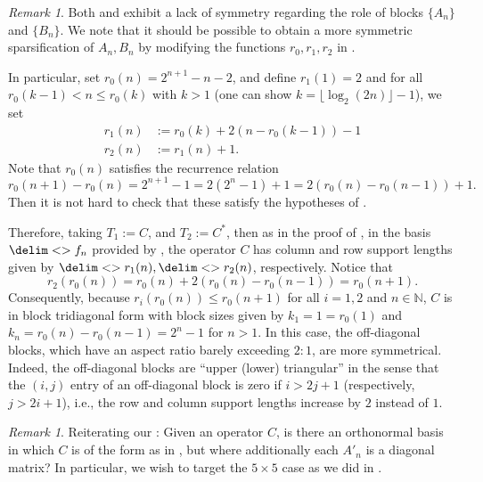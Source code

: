 \documentclass[10pt,reqno]{amsart}
\theoremstyle{remark}
\newtheorem{remark}[theorem]{Remark}
\newcommand{\seq}{\delim<>}
\numberwithin{equation}{section}
\begin{document}
\begin{remark}
  Both  and  exhibit a lack of symmetry regarding the role of blocks $\{A_n\}$ and $\{B_n\}$.
  We note that it should be possible to obtain a more symmetric sparsification of $A_n,B_n$ by modifying the functions $r_0,r_1,r_2$ in .

  In particular, set $r_0(n) = 2^{n+1} - n - 2$, and define $r_1(1) = 2$ and for all $r_0(k-1) < n \le r_0(k)$ with $k > 1$ (one can show $k = \lfloor \log_2 (2n) \rfloor - 1$), we set
  \begin{align*}
    r_1(n) &:= r_0(k) + 2 (n - r_0(k-1)) - 1 \\
    r_2(n) &:= r_1(n) + 1.
  \end{align*}
  Note that $r_0(n)$ satisfies the recurrence relation
  \begin{equation*}
    r_0(n+1) - r_0(n) = 2^{n+1} - 1 = 2(2^n - 1) + 1 = 2(r_0(n) - r_0(n-1)) + 1.
  \end{equation*}
  Then it is not hard to check that these satisfy the hypotheses of .

  Therefore, taking $T_1 := C$, and $T_2 := C^{*}$, then as in the proof of , in the basis $\seq{f_n}$ provided by , the operator $C$ has column and row support lengths given by $\seq{r_1(n)}, \seq{r_2(n)}$, respectively.
  Notice that
  \begin{equation*}
    r_2(r_0(n)) = r_0(n) + 2 (r_0(n) - r_0(n-1)) = r_0(n+1).
  \end{equation*}
  Consequently, because $r_i(r_0(n)) \le r_0(n+1)$ for all $i = 1,2$ and $n \in \mathbb{N}$, $C$ is in block tridiagonal form with block sizes given by $k_1 = 1 = r_0(1)$ and $k_n = r_0(n) - r_0(n-1) = 2^n - 1$ for $n > 1$.
  In this case, the off-diagonal blocks, which have an aspect ratio barely exceeding $2 : 1$, are more symmetrical.
  Indeed, the off-diagonal blocks are ``upper (lower) triangular'' in the sense that the $(i,j)$ entry of an off-diagonal block is zero if $i > 2j+1$ (respectively, $j > 2i +1$),
  i.e., the row and column support lengths increase by $2$ instead of $1$.
\end{remark}

\begin{remark}
  Reiterating our \cite[Problem 20.11]{PPW-2020-TmloVLOt}:
  Given an operator $C$, is there an orthonormal basis  in which
  $C$ is of the form as in , but where additionally each  $A'_n$ is a diagonal matrix?
  In particular, we wish to target the $5\times 5$ case as we did in \cite{PPW-2020-TmloVLOt}.
\end{remark}
\end{document}
